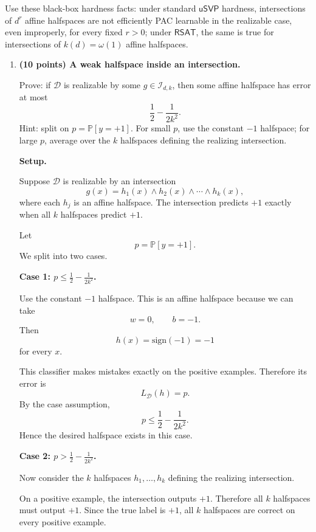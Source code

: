 \documentclass[11pt]{article}
\newcommand{\Pbb}{\mathbb{P}}
\newcommand{\sign}{\mathrm{sign}}
\begin{document}
Use these black-box hardness facts: under standard $\mathsf{uSVP}$ hardness, intersections of $d^r$ affine halfspaces are not efficiently PAC learnable in the realizable case, even improperly, for every fixed $r>0$; under $\mathsf{RSAT}$, the same is true for intersections of $k(d)=\omega(1)$ affine halfspaces.

\begin{enumerate}
    \item \textbf{(10 points) A weak halfspace inside an intersection.}

    Prove: if $\mathcal D$ is realizable by some $g\in\mathcal I_{d,k}$, then some affine halfspace has error at most
    \[
    \frac12-\frac{1}{2k^2}.
    \]
    Hint: split on $p=\mathbb P[y=+1]$. For small $p$, use the constant $-1$ halfspace; for large $p$, average over the $k$ halfspaces defining the realizing intersection.

    \begin{solutionbox}
    \textbf{Setup.}

    Suppose $\mathcal D$ is realizable by an intersection
    \[
    g(x)=h_1(x)\wedge h_2(x)\wedge\cdots\wedge h_k(x),
    \]
    where each $h_j$ is an affine halfspace. The intersection predicts $+1$ exactly when all
    $k$ halfspaces predict $+1$.

    Let
    \[
    p=\Pbb[y=+1].
    \]
    We split into two cases.

    \medskip

    \textbf{Case 1: $p\le \frac12-\frac{1}{2k^2}$.}

    Use the constant $-1$ halfspace. This is an affine halfspace because we can take
    \[
    w=0,
    \qquad
    b=-1.
    \]
    Then
    \[
    h(x)=\sign(-1)=-1
    \]
    for every $x$.

    This classifier makes mistakes exactly on the positive examples. Therefore its error is
    \[
    L_{\mathcal D}(h)=p.
    \]
    By the case assumption,
    \[
    p\le \frac12-\frac{1}{2k^2}.
    \]
    Hence the desired halfspace exists in this case.

    \medskip

    \textbf{Case 2: $p> \frac12-\frac{1}{2k^2}$.}

    Now consider the $k$ halfspaces $h_1,\ldots,h_k$ defining the realizing intersection.

    On a positive example, the intersection outputs $+1$. Therefore all $k$ halfspaces must
    output $+1$. Since the true label is $+1$, all $k$ halfspaces are correct on every positive
    example.


\end{solutionbox}
\end{enumerate}
\end{document}
